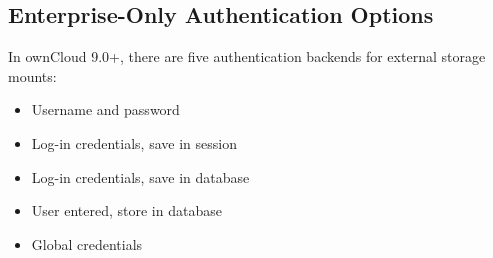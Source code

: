 \documentclass[letterpaper,10pt,english]{sphinxmanual}
\begin{document}
\subsection{Enterprise-Only Authentication Options}
\label{enterprise_external_storage/enterprise_only_auth:enterprise-only-authentication-options}\label{enterprise_external_storage/enterprise_only_auth::doc}
In ownCloud 9.0+, there are five authentication backends for external storage
mounts:
\begin{itemize}
\item {} 
Username and password

\item {} 
Log-in credentials, save in session

\item {} 
Log-in credentials, save in database

\item {} 
User entered, store in database

\item {} 
Global credentials

\end{itemize}
\end{document}
